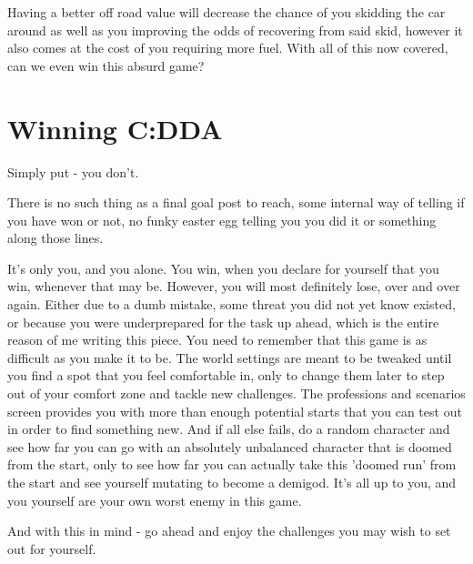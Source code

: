 Having a better off road value will decrease the chance of you skidding the car around as well as you improving the odds of recovering from said skid, however it also comes at the cost of you requiring more fuel.
With all of this now covered, can we even win this absurd game?

\section{Winning C:DDA}

Simply put - you don't.

There is no such thing as a final goal post to reach, some internal way of telling if you have won or not, no funky easter egg telling you you did it or something along those lines.

It's only you, and you alone. You win, when you declare for yourself that you win, whenever that may be. However, you will most definitely lose, over and over again. Either due to a dumb mistake, some threat you did not yet know existed, or because you were underprepared for the task up ahead, which is the entire reason of me writing this piece. You need to remember that this game is as difficult as you make it to be. The world settings are meant to be tweaked until you find a spot that you feel comfortable in, only to change them later to step out of your comfort zone and tackle new challenges. The professions and scenarios screen provides you with more than enough potential starts that you can test out in order to find something new. And if all else fails, do a random character and see how far you can go with an absolutely unbalanced character that is doomed from the start, only to see how far you can actually take this 'doomed run' from the start and see yourself mutating to become a demigod. It's all up to you, and you yourself are your own worst enemy in this game.

And with this in mind - go ahead and enjoy the challenges you may wish to set out for yourself.